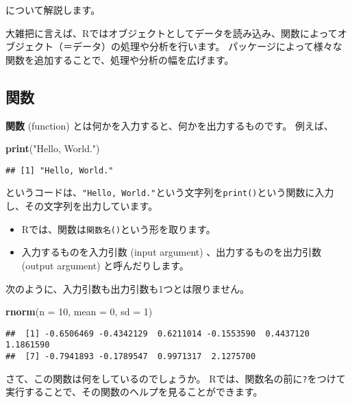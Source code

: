 \documentclass[]{bxjsarticle}
\newenvironment{Shaded}{\begin{snugshade}}{\end{snugshade}}
\newcommand{\DataTypeTok}[1]{\textcolor[rgb]{0.13,0.29,0.53}{#1}}
\newcommand{\DecValTok}[1]{\textcolor[rgb]{0.00,0.00,0.81}{#1}}
\newcommand{\KeywordTok}[1]{\textcolor[rgb]{0.13,0.29,0.53}{\textbf{#1}}}
\newcommand{\NormalTok}[1]{#1}
\newcommand{\StringTok}[1]{\textcolor[rgb]{0.31,0.60,0.02}{#1}}
\providecommand{\tightlist}{%
  \setlength{\itemsep}{0pt}\setlength{\parskip}{0pt}}
\begin{document}
について解説します。

大雑把に言えば、Rではオブジェクトとしてデータを読み込み、関数によってオブジェクト（＝データ）の処理や分析を行います。
パッケージによって様々な関数を追加することで、処理や分析の幅を広げます。

\hypertarget{ux95a2ux6570}{%
\subsection{関数}\label{ux95a2ux6570}}

\textbf{関数} (function) とは何かを入力すると、何かを出力するものです。
例えば、

\begin{Shaded}
\begin{Highlighting}[]
\KeywordTok{print}\NormalTok{(}\StringTok{"Hello, World."}\NormalTok{)}
\end{Highlighting}
\end{Shaded}

\begin{verbatim}
## [1] "Hello, World."
\end{verbatim}

というコードは、\texttt{"Hello,\ World."}という文字列を\texttt{print()}という関数に入力し、その文字列を出力しています。

\begin{itemize}
\tightlist
\item
  Rでは、関数は\texttt{関数名()}という形を取ります。
\item
  入力するものを入力引数 (input argument) 、出力するものを出力引数 (output argument) と呼んだりします。
\end{itemize}

次のように、入力引数も出力引数も1つとは限りません。

\begin{Shaded}
\begin{Highlighting}[]
\KeywordTok{rnorm}\NormalTok{(}\DataTypeTok{n =} \DecValTok{10}\NormalTok{, }\DataTypeTok{mean =} \DecValTok{0}\NormalTok{, }\DataTypeTok{sd =} \DecValTok{1}\NormalTok{)}
\end{Highlighting}
\end{Shaded}

\begin{verbatim}
##  [1] -0.6506469 -0.4342129  0.6211014 -0.1553590  0.4437120  1.1861590
##  [7] -0.7941893 -0.1789547  0.9971317  2.1275700
\end{verbatim}

さて、この関数は何をしているのでしょうか。
Rでは、関数名の前に\texttt{?}をつけて実行することで、その関数のヘルプを見ることができます。
\end{document}
